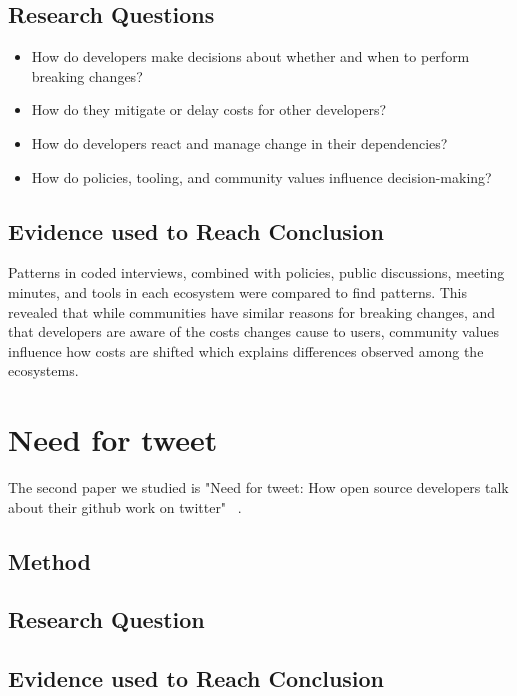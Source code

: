 \documentclass[conference]{IEEEtran}
\begin{document}
\subsection{Research Questions}

\begin{itemize}
    \item How do developers make decisions about whether and when to perform breaking changes?
    \item How do they mitigate or delay costs for other developers?
    \item How do developers react and manage change in their dependencies?
    \item How do policies, tooling, and community values influence decision-making?
\end{itemize}

\subsection{Evidence used to Reach Conclusion}

Patterns in coded interviews, combined with policies, public discussions, meeting minutes, and tools in each ecosystem were compared to find patterns.
This revealed that while communities have similar reasons for breaking changes, and that developers are aware of the costs changes cause to users, community values influence how costs are shifted which explains differences observed among the ecosystems.

\section{Need for tweet}

The second paper we studied is "Need for tweet: How open source developers talk about their github work on twitter"~\cite{fang2020need} .

\subsection{Method}

\subsection{Research Question}

\subsection{Evidence used to Reach Conclusion}
\end{document}
